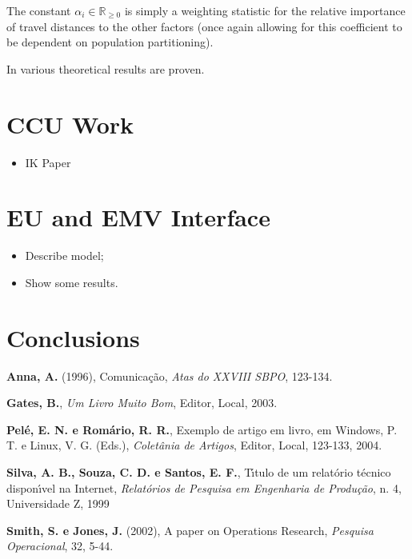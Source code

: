 \documentclass[a4paper,11pt]{article}
\begin{document}
The constant $\alpha_i\in\mathbb{R}_{\geq0}$ is simply a weighting statistic for the relative importance of travel distances to the other factors (once again allowing for this coefficient to be dependent on population partitioning).

In \cite{} various theoretical results are proven.

\section{CCU Work}

\begin{itemize}
    \item IK Paper
\end{itemize}

\section{EU and EMV Interface}

\begin{itemize}
    \item Describe model;
    \item Show some results.
\end{itemize}

\section{Conclusions}

\bigskip
{}

\noindent \textbf {Anna, A.} (1996), Comunica\c c\~ao, \textit{Atas do XXVIII SBPO}, 123-134.

\noindent \textbf{Gates, B.}, \textit{Um Livro Muito Bom}, Editor, Local, 2003.

\noindent  \textbf{Pel\'e, E. N. e Rom\'ario, R. R.}, Exemplo de artigo em livro, em Windows, P. T. e Linux, V. G. (Eds.),
\textit{Colet\^ania de Artigos},  Editor, Local, 123-133, 2004.

\noindent  \textbf{Silva, A. B., Souza, C. D. e Santos, E. F.}, T\'\i tulo de um relat\'orio t\'ecnico dispon\'\i vel na Internet,
\textit{ Relat\'orios de Pesquisa em Engenharia de Produ\c c\~ao}, n. 4,  Universidade Z,
1999


\noindent  \textbf{Smith, S. e Jones, J.} (2002), A paper on Operations Research, \textit{Pesquisa Operacional},
32, 5-44.
\end{document}
